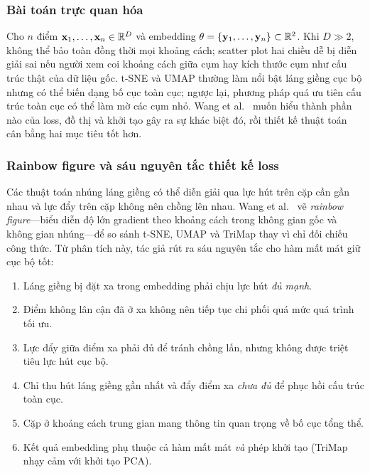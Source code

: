 \subsubsection{Bài toán trực quan hóa}
\label{sec:pacmap-problem}

Cho $n$ điểm $\mathbf{x}_1,\ldots,\mathbf{x}_n \in \mathbb{R}^D$ và embedding $\theta = \{\mathbf{y}_1,\ldots,\mathbf{y}_n\} \subset \mathbb{R}^2$. Khi $D \gg 2$, không thể bảo toàn đồng thời mọi khoảng cách; scatter plot hai chiều dễ bị diễn giải sai nếu người xem coi khoảng cách giữa cụm hay kích thước cụm như cấu trúc thật của dữ liệu gốc. t-SNE và UMAP thường làm nổi bật láng giềng cục bộ nhưng có thể biến dạng bố cục toàn cục; ngược lại, phương pháp quá ưu tiên cấu trúc toàn cục có thể làm mờ các cụm nhỏ. Wang et al.~\cite{wang2021pacmap} muốn hiểu thành phần nào của loss, đồ thị và khởi tạo gây ra sự khác biệt đó, rồi thiết kế thuật toán cân bằng hai mục tiêu tốt hơn.

\subsubsection{Rainbow figure và sáu nguyên tắc thiết kế loss}
\label{sec:pacmap-forces}

Các thuật toán nhúng láng giềng có thể diễn giải qua lực hút trên cặp cần gần nhau và lực đẩy trên cặp không nên chồng lên nhau. Wang et al.~\cite{wang2021pacmap} vẽ \emph{rainbow figure}---biểu diễn độ lớn gradient theo khoảng cách trong không gian gốc và không gian nhúng---để so sánh t-SNE, UMAP và TriMap thay vì chỉ đối chiếu công thức. Từ phân tích này, tác giả rút ra sáu nguyên tắc cho hàm mất mát giữ cục bộ tốt:
\begin{enumerate}
  \item Láng giềng bị đặt xa trong embedding phải chịu lực hút \emph{đủ mạnh}.
  \item Điểm không lân cận đã ở xa không nên tiếp tục chi phối quá mức quá trình tối ưu.
  \item Lực đẩy giữa điểm xa phải đủ để tránh chồng lấn, nhưng không được triệt tiêu lực hút cục bộ.
  \item Chỉ thu hút láng giềng gần nhất và đẩy điểm xa \emph{chưa đủ} để phục hồi cấu trúc toàn cục.
  \item Cặp ở khoảng cách trung gian mang thông tin quan trọng về bố cục tổng thể.
  \item Kết quả embedding phụ thuộc cả hàm mất mát \emph{và} phép khởi tạo (TriMap nhạy cảm với khởi tạo PCA).
\end{enumerate}


